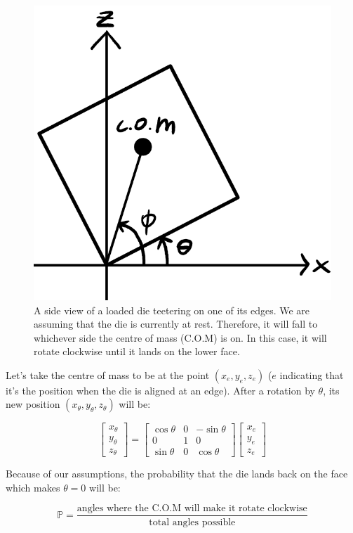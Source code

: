 \documentclass[english,12pt,a4paper,final]{article}
\begin{document}
\begin{figure}[H]
	\centering
	\includegraphics[width=0.5\linewidth]{loadedDie}
	\caption[A loaded die teetering on one of its edges]{A side view of a loaded die teetering on one of its edges. We are assuming that the die is currently at rest. Therefore, it will fall to whichever side the centre of mass (C.O.M) is on. In this case, it will rotate clockwise until it lands on the lower face.}
	\label{fig:loadeddie}
\end{figure}

Let's take the centre of mass to be at the point $(x_e, y_e, z_e)$ ($e$ indicating that it's the position when the die is aligned at an edge). After a rotation by $\theta$, its new position $(x_{\theta}, y_{\theta}, z_{\theta})$ will be:

\begin{equation*}
	\begin{bmatrix} x_{\theta} \\ y_{\theta} \\ z_{\theta} \end{bmatrix} = \begin{bmatrix} \cos\theta & 0 & -\sin\theta \\ 0 & 1 & 0 \\ \sin\theta & 0 & \cos\theta \end{bmatrix} \begin{bmatrix} x_e \\ y_e \\ z_e \end{bmatrix}
\end{equation*}


Because of our assumptions, the probability that the die lands back on the face which makes $\theta = 0$ will be:

\begin{equation*}
	\mathbb{P} = \frac{\text{angles where the C.O.M will make it rotate clockwise}}{\text{total angles possible}}
\end{equation*}
\end{document}
